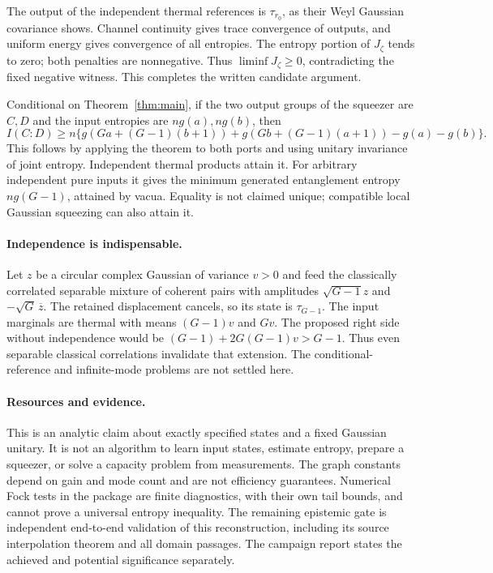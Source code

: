 \documentclass[11pt]{article}
\theoremstyle{remark}\newtheorem{remark}[theorem]{Remark}
\begin{document}
The output of the independent thermal references is $\tau_{r_0}$,
as their Weyl Gaussian covariance shows. Channel continuity gives trace
convergence of outputs, and uniform energy gives convergence of all
entropies. The entropy portion of $J_\zeta$ tends to zero; both penalties
are nonnegative. Thus $\liminf J_\zeta\ge0$, contradicting the fixed
negative witness. This completes the written candidate argument.

Conditional on Theorem~\ref{thm:main}, if the two output groups of the
squeezer are $C,D$ and the input entropies are $ng(a),ng(b)$, then
\[
 I(C:D)\ge n\{g(Ga+(G-1)(b+1))+g(Gb+(G-1)(a+1))-g(a)-g(b)\}.
\]
This follows by applying the theorem to both ports and using unitary
invariance of joint entropy. Independent thermal products attain it.
For arbitrary independent pure inputs it gives the minimum generated
entanglement entropy $ng(G-1)$, attained by vacua. Equality is not claimed
unique; compatible local Gaussian squeezing can also attain it.

\paragraph{Independence is indispensable.}
Let $z$ be a circular complex Gaussian of variance $v>0$ and feed the
classically correlated separable mixture of coherent pairs with amplitudes
$\sqrt{G-1}z$ and $-\sqrt G\,\overline z$. The retained displacement
cancels, so its state is $\tau_{G-1}$. The input marginals are thermal
with means $(G-1)v$ and $Gv$. The proposed right side without independence
would be $(G-1)+2G(G-1)v>G-1$. Thus even separable classical correlations
invalidate that extension. The conditional-reference and infinite-mode
problems are not settled here.

\paragraph{Resources and evidence.}
This is an analytic claim about exactly specified states and a fixed
Gaussian unitary. It is not an algorithm to learn input states, estimate
entropy, prepare a squeezer, or solve a capacity problem from measurements.
The graph constants depend on gain and mode count and are not efficiency
guarantees. Numerical Fock tests in the package are finite diagnostics,
with their own tail bounds, and cannot prove a universal entropy inequality.
The remaining epistemic gate is independent end-to-end validation of this
reconstruction, including its source interpolation theorem and all domain
passages. The campaign report states the achieved and potential
significance separately.

\appendix
\end{document}
